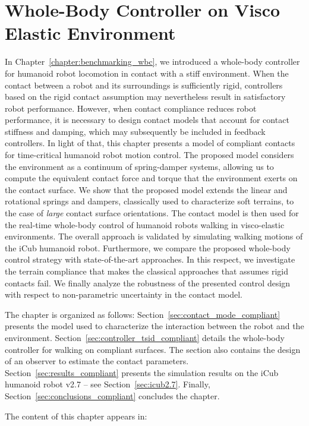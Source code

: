 
\chapter{Whole-Body Controller on Visco Elastic Environment\label{chapter:wbc_visco_elastic}}

\graphicspath{{ChapterCompliantContact/figures}}

In Chapter~\ref{chapter:benchmarking_wbc}, we introduced a whole-body controller for humanoid robot locomotion in contact with a stiff environment. When the contact between a robot and its surroundings is sufficiently rigid, controllers based on the rigid contact assumption may nevertheless result in satisfactory robot performance. However, when contact compliance reduces robot performance, it is necessary to design contact models that account for contact stiffness and damping, which may subsequently be included in feedback controllers.
In light of that, this chapter presents a model of compliant contacts for time-critical humanoid robot motion control. The proposed model considers the environment as a continuum of spring-damper systems, allowing us to compute the equivalent contact force and torque that the environment exerts 
on the contact surface. We show that the proposed model extends the linear and rotational springs and dampers, classically used to characterize soft terrains,
to the case of \emph{large} contact surface orientations.
The contact model is then used for the 
real-time whole-body control of humanoid robots walking in visco-elastic environments. The overall approach is validated by simulating
walking motions of the iCub humanoid robot. Furthermore, we compare the proposed whole-body control strategy with state-of-the-art approaches. In this respect, we investigate the terrain compliance that makes the classical approaches that assumes rigid contacts fail. We finally analyze the robustness of the presented control design with respect to non-parametric uncertainty in the contact model.
\par
The chapter is organized as follows: Section~\ref{sec:contact_mode_compliant} presents the model used to characterize the interaction between the robot and the environment. Section~\ref{sec:controller_tsid_compliant} details the whole-body controller for walking on compliant surfaces. The section also contains the design of an observer to estimate the contact parameters. Section~\ref{sec:results_compliant} presents the simulation results on the iCub humanoid robot v2.7 -- see Section~\ref{sec:icub2.7}. Finally, Section~\ref{sec:conclusions_compliant} concludes the chapter.

The content of this chapter appears in:






